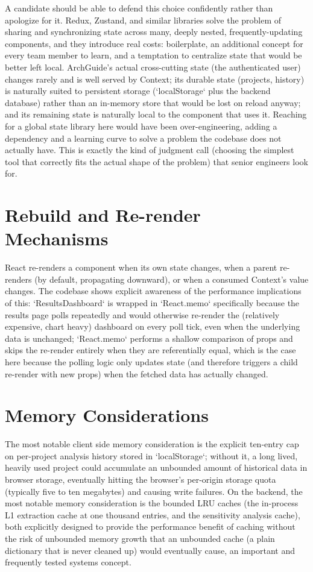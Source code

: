\documentclass[11pt,a4paper]{report}
\begin{document}
A candidate should be able to defend this choice confidently rather than apologize for it. Redux, Zustand, and similar libraries solve the problem of sharing and synchronizing state across many, deeply nested, frequently-updating components, and they introduce real costs: boilerplate, an additional concept for every team member to learn, and a temptation to centralize state that would be better left local. ArchGuide's actual cross-cutting state (the authenticated user) changes rarely and is well served by Context; its durable state (projects, history) is naturally suited to persistent storage (`localStorage` plus the backend database) rather than an in-memory store that would be lost on reload anyway; and its remaining state is naturally local to the component that uses it. Reaching for a global state library here would have been over-engineering, adding a dependency and a learning curve to solve a problem the codebase does not actually have. This is exactly the kind of judgment call (choosing the simplest tool that correctly fits the actual shape of the problem) that senior engineers look for.

\section{Rebuild and Re-render Mechanisms}

React re-renders a component when its own state changes, when a parent re-renders (by default, propagating downward), or when a consumed Context's value changes. The codebase shows explicit awareness of the performance implications of this: `ResultsDashboard` is wrapped in `React.memo` specifically because the results page polls repeatedly and would otherwise re-render the (relatively expensive, chart heavy) dashboard on every poll tick, even when the underlying data is unchanged; `React.memo` performs a shallow comparison of props and skips the re-render entirely when they are referentially equal, which is the case here because the polling logic only updates state (and therefore triggers a child re-render with new props) when the fetched data has actually changed.

\section{Memory Considerations}

The most notable client side memory consideration is the explicit ten-entry cap on per-project analysis history stored in `localStorage`; without it, a long lived, heavily used project could accumulate an unbounded amount of historical data in browser storage, eventually hitting the browser's per-origin storage quota (typically five to ten megabytes) and causing write failures. On the backend, the most notable memory consideration is the bounded LRU caches (the in-process L1 extraction cache at one thousand entries, and the sensitivity analysis cache), both explicitly designed to provide the performance benefit of caching without the risk of unbounded memory growth that an unbounded cache (a plain dictionary that is never cleaned up) would eventually cause, an important and frequently tested systems concept.
\end{document}
